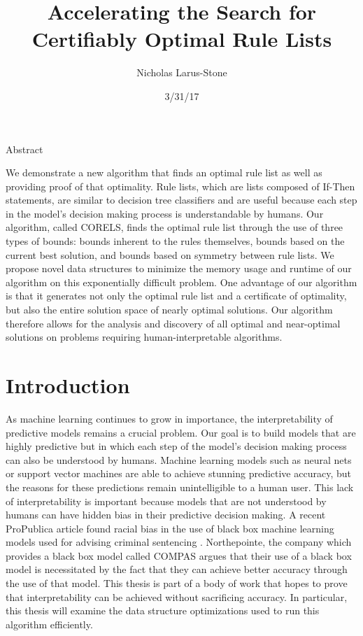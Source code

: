 \documentclass[]{article}
\begin{document}
\title{Accelerating the Search for Certifiably Optimal Rule Lists}
\author{Nicholas Larus-Stone}
\date{3/31/17}
\maketitle

\begin{center}
Abstract
\end{center}

We demonstrate a new algorithm that finds an optimal rule list as well as providing proof of that optimality. Rule lists, which are lists composed of If-Then statements, are similar to decision tree classifiers and are useful because each step in the model's decision making process is understandable by humans. Our algorithm, called CORELS, finds the optimal rule list through the use of three types of bounds: bounds inherent to the rules themselves, bounds based on the current best solution, and bounds based on symmetry between rule lists. We propose novel data structures to minimize the memory usage and runtime of our algorithm on this exponentially difficult problem. One advantage of our algorithm is that it generates not only the optimal rule list and a certificate of optimality, but also the entire solution space of nearly optimal solutions. Our algorithm therefore allows for the analysis and discovery of all optimal and near-optimal solutions on problems requiring human-interpretable algorithms.

\section{Introduction}

As machine learning continues to grow in importance, the interpretability of predictive models remains a crucial problem.
Our goal is to build models that are highly predictive but in which each step of the model's decision making process can also be understood by humans.
Machine learning models such as neural nets or support vector machines are able to achieve stunning predictive accuracy, but the reasons for these predictions remain unintelligible to a human user.
This lack of interpretability is important because models that are not understood by humans can have hidden bias in their predictive decision making.
A recent ProPublica article found racial bias in the use of black box machine learning models used for advising criminal sentencing \cite{LarsonMaKiAn16}.
Northepointe, the company which provides a black box model called COMPAS argues that their use of a black box model is necessitated by the fact that they can achieve better accuracy through the use of that model.
This thesis is part of a body of work that hopes to prove that interpretability can be achieved without sacrificing accuracy.
In particular, this thesis will examine the data structure optimizations used to run this algorithm efficiently.
\end{document}
